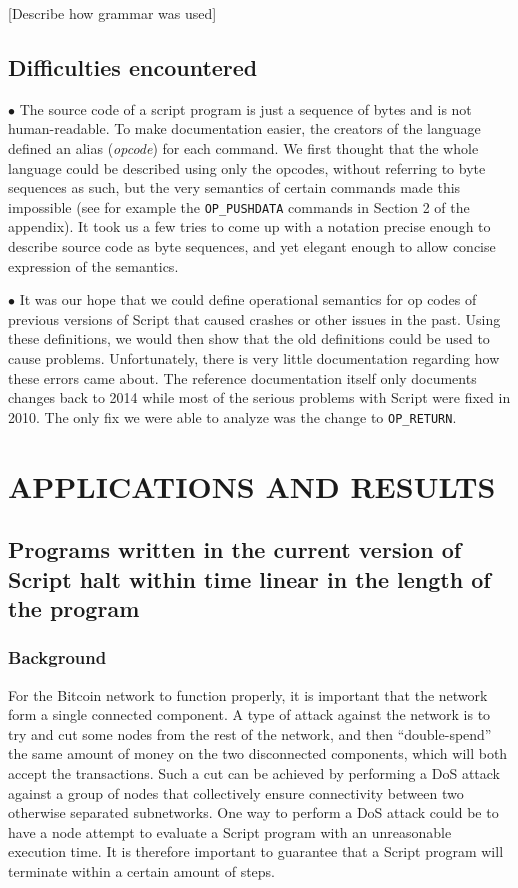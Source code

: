 \documentclass[letterpaper, 10 pt, conference]{ieeeconf}
\begin{document}
[Describe how grammar was used]

\subsection{Difficulties encountered}

$\bullet$ The source code of a script program is just a sequence of bytes and is not human-readable. To make documentation easier, the creators of the language defined an alias (\textit{opcode}) for each command. We first thought that the whole language could be described using only the opcodes, without referring to byte sequences as such, but the very semantics of certain commands made this impossible (see for example the \texttt{OP\_PUSHDATA} commands in Section 2 of the appendix). It took us a few tries to come up with a notation precise enough to describe source code as byte sequences, and yet elegant enough to allow concise expression of the semantics.

$\bullet$ It was our hope that we could define operational semantics for op codes of previous versions of Script that caused crashes or other issues in the past.  Using these definitions, we would then show that the old definitions could be used to cause problems.  Unfortunately, there is very little documentation regarding how these errors came about.  The reference documentation itself only documents changes back to 2014 while most of the serious problems with Script were fixed in 2010. The only fix we were able to analyze was the change to \texttt{OP\_RETURN}.


\section{APPLICATIONS AND RESULTS}

\subsection{Programs written in the current version of Script halt within time linear in the length of the program}

\subsubsection{Background}
For the Bitcoin network to function properly, it is important that the network form a single connected component. A type of attack against the network is to try and cut some nodes from the rest of the network, and then ``double-spend'' the same amount of money on the two disconnected components, which will both accept the transactions. Such a cut can be achieved by performing a DoS attack against a group of nodes that collectively ensure connectivity between two otherwise separated subnetworks. One way to perform a DoS attack could be to have a node attempt to evaluate a Script program with an unreasonable execution time. It is therefore important to guarantee that a Script program will terminate within a certain amount of steps.
\end{document}
